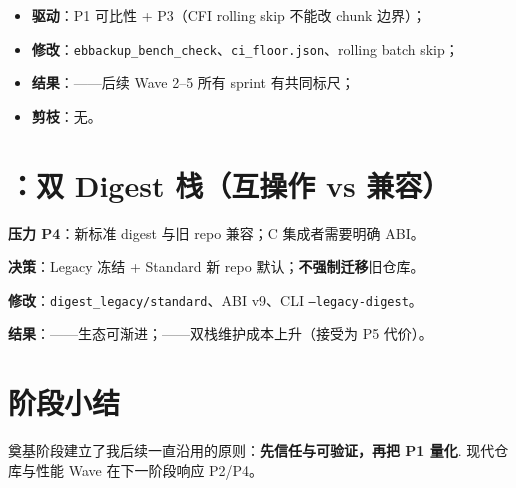 \begin{itemize}
  \item \textbf{驱动}：P1 可比性 + P3（CFI rolling skip 不能改 chunk 边界）；
  \item \textbf{修改}：\texttt{ebbackup\_bench\_check}、\texttt{ci\_floor.json}、rolling batch skip；
  \item \textbf{结果}：——后续 Wave 2--5 所有 sprint 有共同标尺；
  \item \textbf{剪枝}：无。
\end{itemize}

\section{：双 Digest 栈（互操作 vs 兼容）}

\textbf{压力 P4}：新标准 digest 与旧 repo 兼容；C 集成者需要明确 ABI。

\textbf{决策}：Legacy 冻结 + Standard 新 repo 默认；\textbf{不强制迁移}旧仓库。

\textbf{修改}：\texttt{digest\_legacy/standard}、ABI v9、CLI \texttt{--legacy-digest}。

\textbf{结果}：——生态可渐进；——双栈维护成本上升（接受为 P5 代价）。

\section{阶段小结}

奠基阶段建立了我后续一直沿用的原则：\textbf{先信任与可验证，再把 P1 量化}. 现代仓库与性能 Wave 在下一阶段响应 P2/P4。
